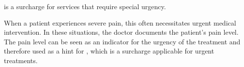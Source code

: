 

 is a surcharge for services that require special urgency.

When a patient experiences severe pain, this often necessitates urgent medical intervention.
In these situations, the doctor documents the patient's pain level.
The pain level can be seen as an indicator for the urgency of the treatment and therefore used as a hint for , which is a surcharge applicable for urgent treatments.

